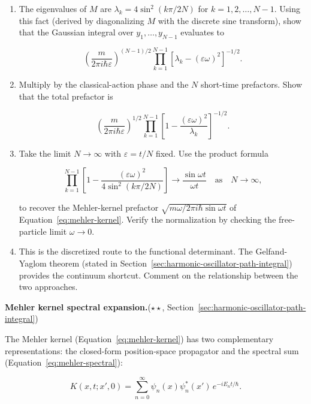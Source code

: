 \begin{problemset}
\begin{enumerate}
\item[(b)] The eigenvalues of $M$ are $\lambda_k = 4\sin^2(k\pi/2N)$ for $k = 1,2,\ldots,N-1$. Using this fact (derived by diagonalizing $M$ with the discrete sine transform), show that the Gaussian integral over $y_1,\ldots,y_{N-1}$ evaluates to
\begin{linenomath}
\begin{equation}
\left(\frac{m}{2\pi i\hbar\varepsilon}\right)^{(N-1)/2}
\prod_{k=1}^{N-1}\left[\lambda_k - (\varepsilon\omega)^2\right]^{-1/2}.
\end{equation}
\end{linenomath}

\item[(c)] Multiply by the classical-action phase and the $N$ short-time prefactors. Show that the total prefactor is
\begin{linenomath}
\begin{equation}
\left(\frac{m}{2\pi i\hbar\varepsilon}\right)^{1/2}
\prod_{k=1}^{N-1}\left[1 - \frac{(\varepsilon\omega)^2}{\lambda_k}\right]^{-1/2}.
\end{equation}
\end{linenomath}

\item[(d)] Take the limit $N\to\infty$ with $\varepsilon = t/N$ fixed. Use the product formula
\begin{linenomath}
\begin{equation}
\prod_{k=1}^{N-1}\left[1 - \frac{(\varepsilon\omega)^2}{4\sin^2(k\pi/2N)}\right] \longrightarrow \frac{\sin\omega t}{\omega t}\quad\text{as}\quad N\to\infty,
\end{equation}
\end{linenomath}
to recover the Mehler-kernel prefactor $\sqrt{m\omega/2\pi i\hbar\sin\omega t}$ of Equation~\eqref{eq:mehler-kernel}. Verify the normalization by checking the free-particle limit $\omega \to 0$.

\item[(e)] This is the discretized route to the functional determinant. The Gelfand-Yaglom theorem (stated in Section~\ref{sec:harmonic-oscillator-path-integral}) provides the continuum shortcut. Comment on the relationship between the two approaches.
\end{enumerate}

\item[6.] \textbf{Mehler kernel spectral expansion.}\quad($\star\star$, Section~\ref{sec:harmonic-oscillator-path-integral})

The Mehler kernel (Equation~\eqref{eq:mehler-kernel}) has two complementary representations: the closed-form position-space propagator and the spectral sum (Equation~\eqref{eq:mehler-spectral}):
\begin{linenomath}
\begin{equation}
K(x,t;x',0) = \sum_{n=0}^{\infty} \psi_n(x)\psi_n^*(x')\,e^{-iE_n t/\hbar}.
\end{equation}
\end{linenomath}


\end{problemset}
